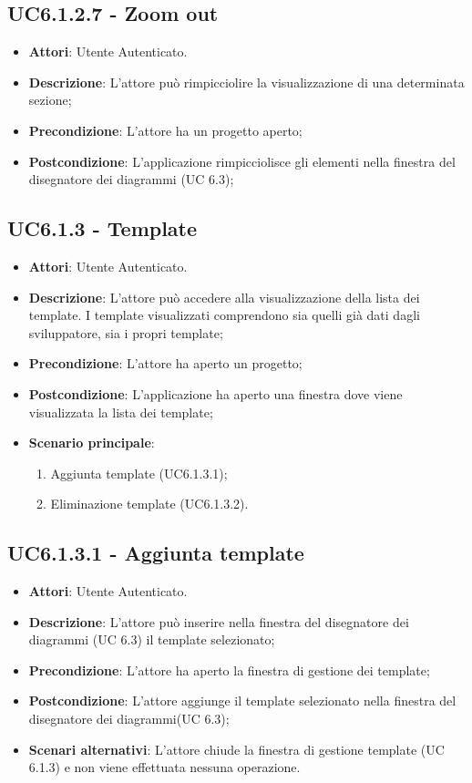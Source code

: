 \subsection{UC6.1.2.7 - Zoom out} 
\label{ssec:UC6.1.2.7} 
\begin{itemize} 
\item \textbf{Attori}: Utente Autenticato.
\item \textbf{Descrizione}: L’attore può rimpicciolire la visualizzazione di una determinata sezione;
\item \textbf{Precondizione}: L’attore ha un progetto aperto;
\item \textbf{Postcondizione}: L’applicazione rimpicciolisce gli elementi nella finestra del disegnatore dei diagrammi (UC 6.3);
\end{itemize} 
\subsection{UC6.1.3 - Template} 
\label{ssec:UC6.1.3} 
\begin{itemize} 
\item \textbf{Attori}: Utente Autenticato.
\item \textbf{Descrizione}: L’attore può accedere alla visualizzazione della lista dei template. I template visualizzati comprendono sia quelli già dati dagli sviluppatore, sia i propri template;
\item \textbf{Precondizione}: L’attore ha aperto un progetto;
\item \textbf{Postcondizione}: L'applicazione ha aperto una finestra dove viene visualizzata la lista dei template;
\item \textbf{Scenario principale}: \begin{enumerate}\item Aggiunta template (UC6.1.3.1);\item Eliminazione template (UC6.1.3.2). 
 \end{enumerate}
\end{itemize} 
\subsection{UC6.1.3.1 - Aggiunta template} 
\label{ssec:UC6.1.3.1} 
\begin{itemize} 
\item \textbf{Attori}: Utente Autenticato.
\item \textbf{Descrizione}: L'attore può inserire nella finestra del disegnatore dei diagrammi (UC 6.3) il template selezionato;
\item \textbf{Precondizione}: L'attore ha aperto la finestra di gestione dei template;
\item \textbf{Postcondizione}: L'attore aggiunge il template selezionato nella finestra del disegnatore dei diagrammi(UC 6.3);
\item \textbf{Scenari alternativi}: L'attore chiude la finestra di gestione template (UC 6.1.3) e non viene effettuata nessuna operazione.
\end{itemize} 
